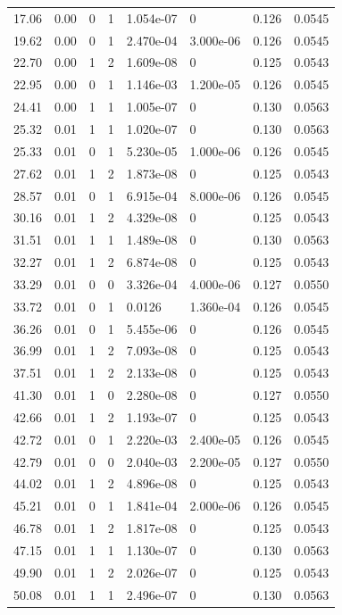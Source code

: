 \documentclass[preview]{standalone}
\begin{document}
{{\begin{tabular}{L{1.2cm}C{1.2cm} C{0.3cm}C{0.5cm} C{1.4cm}C{1.4cm} C{1.4cm}C{1.4cm}}
  17.06  &  0.00  & 0     &  1 &  1.054e-07  & 0  & 0.126 &  0.0545   \\ 
  19.62  &  0.00  & 0     &  1 &  2.470e-04  & 3.000e-06  & 0.126 &  0.0545   \\ 
  22.70  &  0.00  & 1     &  2 &  1.609e-08  & 0  & 0.125 &  0.0543   \\ 
  22.95  &  0.00  & 0     &  1 &  1.146e-03  & 1.200e-05  & 0.126 &  0.0545   \\ 
  24.41  &  0.00  & 1     &  1 &  1.005e-07  & 0  & 0.130 &  0.0563   \\ 
  25.32  &  0.01  & 1     &  1 &  1.020e-07  & 0  & 0.130 &  0.0563   \\ 
  25.33  &  0.01  & 0     &  1 &  5.230e-05  & 1.000e-06  & 0.126 &  0.0545   \\ 
  27.62  &  0.01  & 1     &  2 &  1.873e-08  & 0  & 0.125 &  0.0543   \\ 
  28.57  &  0.01  & 0     &  1 &  6.915e-04  & 8.000e-06  & 0.126 &  0.0545   \\ 
  30.16  &  0.01  & 1     &  2 &  4.329e-08  & 0  & 0.125 &  0.0543   \\ 
  31.51  &  0.01  & 1     &  1 &  1.489e-08  & 0  & 0.130 &  0.0563   \\ 
  32.27  &  0.01  & 1     &  2 &  6.874e-08  & 0  & 0.125 &  0.0543   \\ 
  33.29  &  0.01  & 0     &  0 &  3.326e-04  & 4.000e-06  & 0.127 &  0.0550   \\ 
  33.72  &  0.01  & 0     &  1 &  0.0126  & 1.360e-04  & 0.126 &  0.0545   \\ 
  36.26  &  0.01  & 0     &  1 &  5.455e-06  & 0  & 0.126 &  0.0545   \\ 
  36.99  &  0.01  & 1     &  2 &  7.093e-08  & 0  & 0.125 &  0.0543   \\ 
  37.51  &  0.01  & 1     &  2 &  2.133e-08  & 0  & 0.125 &  0.0543   \\ 
  41.30  &  0.01  & 1     &  0 &  2.280e-08  & 0  & 0.127 &  0.0550   \\ 
  42.66  &  0.01  & 1     &  2 &  1.193e-07  & 0  & 0.125 &  0.0543   \\ 
  42.72  &  0.01  & 0     &  1 &  2.220e-03  & 2.400e-05  & 0.126 &  0.0545   \\ 
  42.79  &  0.01  & 0     &  0 &  2.040e-03  & 2.200e-05  & 0.127 &  0.0550   \\ 
  44.02  &  0.01  & 1     &  2 &  4.896e-08  & 0  & 0.125 &  0.0543   \\ 
  45.21  &  0.01  & 0     &  1 &  1.841e-04  & 2.000e-06  & 0.126 &  0.0545   \\ 
  46.78  &  0.01  & 1     &  2 &  1.817e-08  & 0  & 0.125 &  0.0543   \\ 
  47.15  &  0.01  & 1     &  1 &  1.130e-07  & 0  & 0.130 &  0.0563   \\ 
  49.90  &  0.01  & 1     &  2 &  2.026e-07  & 0  & 0.125 &  0.0543   \\ 
  50.08  &  0.01  & 1     &  1 &  2.496e-07  & 0  & 0.130 &  0.0563   \\ 
\hline 
\end{tabular} 

}}
\end{document}
